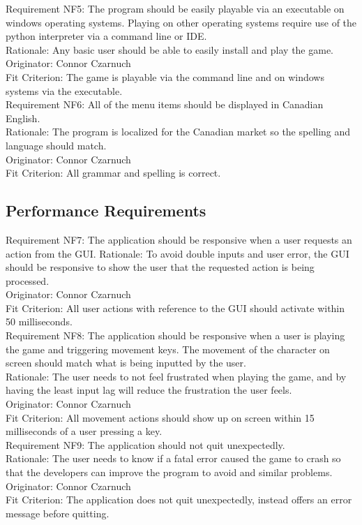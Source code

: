 \documentclass[12pt, titlepage]{article}
\begin{document}
Requirement NF5: The program should be easily playable via an executable on windows operating systems. Playing on other operating systems require use of the python interpreter via a command line or IDE.\\
Rationale: Any basic user should be able to easily install and play the game.\\
Originator: Connor Czarnuch\\
Fit Criterion: The game is playable via the command line and on windows systems via the executable.\\

Requirement NF6: All of the menu items should be displayed in Canadian English.\\
Rationale: The program is localized for the Canadian market so the spelling and language should match.\\
Originator: Connor Czarnuch\\
Fit Criterion: All grammar and spelling is correct.

\subsection{Performance Requirements}

Requirement NF7: The application should be responsive when a user requests an action from the GUI.
Rationale: To avoid double inputs and user error, the GUI should be responsive to show the user that the requested action is being processed.\\
Originator: Connor Czarnuch\\
Fit Criterion: All user actions with reference to the GUI should activate within 50 milliseconds.\\

Requirement NF8: The application should be responsive when a user is playing the game and triggering movement keys. The movement of the character on screen should match what is being inputted by the user.\\
Rationale: The user needs to not feel frustrated when playing the game, and by having the least input lag will reduce the frustration the user feels.\\
Originator: Connor Czarnuch\\
Fit Criterion: All movement actions should show up on screen within 15 milliseconds of a user pressing a key.\\

Requirement NF9: The application should not quit unexpectedly.\\
Rationale: The user needs to know if a fatal error caused the game to crash so that the developers can improve the program to avoid and similar problems.\\
Originator: Connor Czarnuch\\
Fit Criterion: The application does not quit unexpectedly, instead offers an error message before quitting.\\
\end{document}
